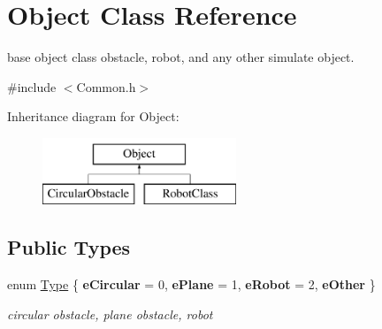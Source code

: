 \hypertarget{classObject}{\section{Object Class Reference}
\label{classObject}
}


base object class obstacle, robot, and any other simulate object.  




{\ttfamily \#include $<$Common.\-h$>$}

Inheritance diagram for Object\-:\begin{figure}[H]
\begin{center}
\leavevmode
\includegraphics[height=2.000000cm]{classObject}
\end{center}
\end{figure}
\subsection*{Public Types}
\begin{DoxyCompactItemize}
\item 
enum \hyperlink{classObject_ad8dadb365053c182931671a424199e36}{Type} \{ {\bfseries e\-Circular} = 0, 
{\bfseries e\-Plane} = 1, 
{\bfseries e\-Robot} = 2, 
{\bfseries e\-Other}
 \}
\begin{DoxyCompactList}\small\item\em circular obstacle, plane obstacle, robot \end{DoxyCompactList}\end{DoxyCompactItemize}
